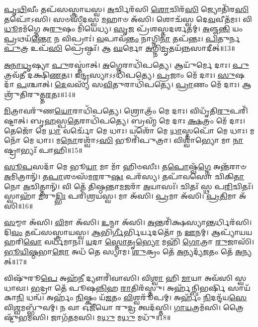 \-\ul{𑌪𑍃}\-\-\ul{𑌥𑌿}\-𑌵𑍀𑌂 𑌤𑌪᳴𑌸𑌸𑍍𑌤𑍍𑌰𑌾𑌯𑌸𑍍𑌵। 
\-\ul{𑌅}\-𑌰𑍍𑌚𑌿𑌰᳴𑌸𑌿 \ul{𑌶𑍋}\-𑌚𑌿𑌰᳴\-\ul{𑌸𑌿} 𑌜𑍍𑌯𑍋𑌤𑌿᳴𑌰\-\ul{𑌸𑌿} 𑌤𑌪𑍋᳴𑌽𑌸𑌿। 
𑌸𑍞𑌸𑍀᳴𑌦𑌸𑍍𑌵 \ul{𑌮}\-𑌹𑌾𑍞 𑌅᳴𑌸𑌿। 
𑌶𑍋𑌚᳴𑌸𑍍𑌵 𑌦𑍇\-\ul{𑌵}\-𑌵𑍀𑌤᳴𑌮𑌃। 
𑌵𑌿\-\ul{𑌧𑍂}\-𑌮𑌮᳴𑌗𑍍𑌨𑍇 𑌅\-\ul{𑌰𑍁}\-𑌷𑌂 𑌮𑌿᳴𑌯𑍇𑌧𑍍𑌯। 
\-\ul{𑌸𑍃}\-𑌜 𑌪𑍍𑌰᳴𑌶𑌸𑍍𑌤𑌦𑌰𑍍\mbox{}\-\ul{𑌶}\-𑌤𑌮𑍍। 
\-\ul{𑌅}\-𑌞𑍍𑌜\-\ul{𑌨𑍍𑌤𑌿} 𑌯𑌂 \ul{𑌪𑍍𑌰}\-𑌥𑌯᳴\-\ul{𑌨𑍍𑌤𑍋} 𑌨 𑌵𑌿𑌪𑍍𑌰𑌾𑌃॑। 
\-\ul{𑌵}\-𑌪𑌾𑌵᳴\-\ul{𑌨𑍍𑌤𑌂} 𑌨𑌾𑌗𑍍𑌨𑌿\-\ul{𑌨𑌾} 𑌤𑌪᳴𑌨𑍍𑌤𑌃। 
\-\ul{𑌪𑌿}\-𑌤𑍁𑌰𑍍𑌨 \ul{𑌪𑍁}\-𑌤𑍍𑌰 𑌉𑌪᳴\-\ul{𑌸𑌿} 𑌪𑍍𑌰𑍇𑌷𑍍𑌠𑌃᳴। 
𑌆 \ul{𑌘}\-𑌰𑍍𑌮𑍋 \ul{𑌅}\-𑌗𑍍𑌨𑌿\-\ul{𑌮𑍃}\-𑌤𑌯᳴𑌨𑍍𑌨𑌸𑌾𑌦𑍀𑌤𑍍॥13॥

\-\ul{𑌅}\-\-\ul{𑌨𑌾}\-\-\ul{𑌧𑍃}\-𑌷𑍍𑌯𑌾 \ul{𑌪𑍁}\-𑌰𑌸𑍍𑌤𑌾॑𑌤𑍍। 
\-\ul{𑌅}\-𑌗𑍍𑌨𑍇𑌰𑌾𑌧𑌿᳴𑌪𑌤𑍍𑌯𑍇। 
𑌆𑌯𑍁᳴𑌰𑍍𑌮𑍇 𑌦𑌾𑌃। 
\-\ul{𑌪𑍁}\-𑌤𑍍𑌰𑌵᳴𑌤𑍀 𑌦𑌕𑍍𑌷𑌿\-\ul{𑌣}\-𑌤𑌃। 
𑌇\-\ul{𑌨𑍍𑌦𑍍𑌰}\-𑌸𑍍𑌯𑌾𑌽𑌽𑌧𑌿᳴𑌪𑌤𑍍𑌯𑍇। 
\-\ul{𑌪𑍍𑌰}\-𑌜𑌾𑌂 𑌮𑍇᳴ 𑌦𑌾𑌃। 
\-\ul{𑌸𑍁}\-𑌷𑌦𑌾᳴ \ul{𑌪}\-𑌶𑍍𑌚𑌾𑌤𑍍। 
\-\ul{𑌦𑍇}\-𑌵𑌸𑍍𑌯᳴ 𑌸\-\ul{𑌵𑌿}\-𑌤𑍁𑌰𑌾𑌧𑌿᳴𑌪𑌤𑍍𑌯𑍇। 
\-\ul{𑌪𑍍𑌰𑌾}\-𑌣𑌂 𑌮𑍇᳴ 𑌦𑌾𑌃। 
𑌆𑌶𑍍𑌰𑍁᳴𑌤𑌿𑌰𑍁𑌤𑍍𑌤\-\ul{𑌰}\-𑌤𑌃॥14॥

\-\ul{𑌮𑌿}\-𑌤𑍍𑌰𑌾𑌵𑌰𑍁᳴𑌣\-\ul{𑌯𑍋}\-𑌰𑌾𑌧𑌿᳴𑌪𑌤𑍍𑌯𑍇। 
𑌶𑍍𑌰𑍋𑌤𑍍𑌰𑌂᳴ 𑌮𑍇 𑌦𑌾𑌃। 
𑌵𑌿𑌧𑍃᳴𑌤𑌿\-\ul{𑌰𑍁}\-𑌪𑌰𑌿᳴𑌷𑍍𑌟𑌾𑌤𑍍। 
𑌬𑍃\-\ul{𑌹}\-𑌸𑍍𑌪\-\ul{𑌤𑍇}\-𑌰𑌾𑌧𑌿᳴𑌪𑌤𑍍𑌯𑍇। 
𑌬𑍍𑌰𑌹𑍍𑌮᳴ 𑌮𑍇 𑌦𑌾𑌃 \ul{𑌕𑍍𑌷}\-𑌤𑍍𑌰𑌂 𑌮𑍇᳴ 𑌦𑌾𑌃। 
𑌤𑍇𑌜𑍋᳴ 𑌮𑍇 \ul{𑌧𑌾} 𑌵𑌰𑍍𑌚𑍋᳴ 𑌮𑍇 𑌧𑌾𑌃। 
𑌯𑌶𑍋᳴ 𑌮𑍇 \ul{𑌧𑌾}\-𑌸𑍍𑌤𑌪𑍋᳴ 𑌮𑍇 𑌧𑌾𑌃। 
𑌮𑌨𑍋᳴ 𑌮𑍇 𑌧𑌾𑌃। 
𑌮\-\ul{𑌨𑍋}\-𑌰𑌶𑍍𑌵𑌾᳴𑌽\-\ul{𑌸𑌿} 𑌭𑍂𑌰𑌿᳴𑌪𑍁𑌤𑍍𑌰𑌾। 
𑌵𑌿𑌶𑍍𑌵𑌾॑𑌭𑍍𑌯𑍋 𑌮𑌾 \ul{𑌨𑌾}\-𑌷𑍍𑌟𑍍𑌰𑌾𑌭𑍍𑌯𑌃᳴ 𑌪𑌾𑌹𑌿॥15॥

\-\ul{𑌸𑍂}\-\-\ul{𑌪}\-𑌸𑌦𑌾᳴ 𑌮𑍇 𑌭𑍂\-\ul{𑌯𑌾} 𑌮𑌾 𑌮𑌾᳴ 𑌹𑌿𑍞𑌸𑍀𑌃। 
𑌤\-\ul{𑌪𑍋}\-𑌷𑍍𑌵᳴\-\ul{𑌗𑍍𑌨𑍇} 𑌅𑌨𑍍𑌤᳴𑌰𑌾𑍞 \ul{𑌅}\-𑌮𑌿𑌤𑍍𑌰𑌾𑌨𑍍᳴। 
𑌤\-\ul{𑌪𑌾}\-𑌶𑍞𑌸᳴𑌮\-\ul{𑌰}\-𑌰𑍁\-\ul{𑌷𑌃} 𑌪𑌰᳴𑌸𑍍𑌯। 
𑌤𑌪𑌾᳴𑌵𑌸𑍋 𑌚𑌿𑌕𑌿\-\ul{𑌤𑌾}\-𑌨𑍋 \ul{𑌅}\-𑌚𑌿𑌤𑍍𑌤𑌾𑌨𑍍᳴। 
𑌵𑌿 𑌤𑍇᳴ 𑌤𑌿𑌷𑍍𑌠𑌨𑍍𑌤𑌾\-\ul{𑌮}\-𑌜𑌰𑌾᳴ \ul{𑌅}\-𑌯𑌾𑌸𑌃᳴। 
𑌚𑌿𑌤𑌃᳴ 𑌸𑍍𑌥 𑌪\-\ul{𑌰𑌿}\-𑌚𑌿𑌤𑌃᳴। 
𑌸𑍍𑌵𑌾𑌹𑌾᳴ \ul{𑌮}\-𑌰𑍁\-\ul{𑌦𑍍𑌭𑌿𑌃} 𑌪𑌰𑌿᳴𑌶𑍍𑌰𑌯𑌸𑍍𑌵। 
𑌮𑌾 𑌅᳴𑌸𑌿। 
\-\ul{𑌪𑍍𑌰}\-𑌮𑌾 𑌅᳴𑌸𑌿। 
\-\ul{𑌪𑍍𑌰}\-\-\ul{𑌤𑌿}\-𑌮𑌾 𑌅᳴𑌸𑌿॥16॥

\-\ul{𑌸}\-𑌮𑍍𑌮𑌾 𑌅᳴𑌸𑌿। 
\-\ul{𑌵𑌿}\-𑌮𑌾 𑌅᳴𑌸𑌿। 
\-\ul{𑌉}\-𑌨𑍍𑌮𑌾 𑌅᳴𑌸𑌿। 
\-\ul{𑌅}\-𑌨𑍍𑌤𑌰𑌿᳴𑌕𑍍𑌷𑌸𑍍𑌯𑌾\-\ul{𑌨𑍍𑌤}\-𑌰𑍍𑌧𑌿\-𑌰᳴𑌸𑌿। 
𑌦𑌿\-\ul{𑌵𑌂} 𑌤𑌪᳴𑌸𑌸𑍍𑌤𑍍𑌰𑌾𑌯𑌸𑍍𑌵। 
\-\ul{𑌆}\-𑌭𑌿\-\ul{𑌰𑍍𑌗𑍀}\-𑌰𑍍𑌭𑌿𑌰𑍍𑌯𑌦𑌤𑍋᳴ 𑌨 \ul{𑌊}\-𑌨𑌮𑍍। 
𑌆𑌪𑍍𑌯𑌾᳴𑌯𑌯 𑌹𑌰𑌿\-\ul{𑌵𑍋} 𑌵𑌰𑍍𑌧᳴𑌮𑌾𑌨𑌃। 
\-\ul{𑌯}\-𑌦𑌾 \ul{𑌸𑍍𑌤𑍋}\-𑌤𑍃\-\ul{𑌭𑍍𑌯𑍋} 𑌮𑌹𑌿᳴ \ul{𑌗𑍋}\-𑌤𑍍𑌰𑌾 \ul{𑌰𑍁}\-𑌜𑌾𑌸𑌿᳴। 
\-\ul{𑌭𑍂}\-\-\ul{𑌯𑌿}\-\-\ul{𑌷𑍍𑌠}\-𑌭𑌾\-\ul{𑌜𑍋} 𑌅𑌧᳴ 𑌤𑍇 𑌸𑍍𑌯𑌾𑌮। 
\-\ul{𑌶𑍁}\-𑌕𑍍𑌰𑌂 𑌤𑍇᳴ \ul{𑌅}\-𑌨𑍍𑌯𑌦𑍍𑌯᳴\-\ul{𑌜}\-𑌤𑌂 𑌤𑍇᳴ \ul{𑌅}\-𑌨𑍍𑌯𑌤𑍍॥17॥

𑌵𑌿𑌷𑍁᳴𑌰𑍂\-\ul{𑌪𑍇} 𑌅𑌹᳴\-\ul{𑌨𑍀} 𑌦𑍍𑌯𑍗𑌰𑌿᳴𑌵𑌾𑌸𑌿। 
𑌵𑌿\-\ul{𑌶𑍍𑌵𑌾} 𑌹𑌿 \ul{𑌮𑌾}\-𑌯𑌾 𑌅𑌵᳴𑌸𑌿 𑌸𑍍𑌵𑌧𑌾𑌵𑌃। 
\-\ul{𑌭}\-𑌦𑍍𑌰𑌾 𑌤𑍇᳴ 𑌪𑍂𑌷\-\ul{𑌨𑍍𑌨𑌿}\-𑌹 \ul{𑌰𑌾}\-𑌤𑌿𑌰᳴𑌸𑍍𑌤𑍁। 
𑌅𑌰𑍍\mbox{}𑌹᳴𑌨𑍍𑌬𑌿𑌭𑌰𑍍\mbox{}\-\ul{𑌷𑌿} 𑌸𑌾𑌯᳴𑌕𑌾\-\ul{𑌨𑌿} 𑌧𑌨𑍍𑌵᳴। 
𑌅𑌰𑍍\mbox{}𑌹𑌂᳴ \ul{𑌨𑌿}\-𑌷𑍍𑌕𑌂 𑌯᳴\-\ul{𑌜}\-𑌤𑌂  \ul{𑌵𑌿}\-𑌶𑍍𑌵𑌰𑍂᳴𑌪𑌮𑍍। 
𑌅𑌰𑍍\mbox{}𑌹𑌂᳴ \ul{𑌨𑌿}\-𑌦𑌨𑍍𑌦᳴𑌯\-\ul{𑌸𑍇} 𑌵𑌿\-\ul{𑌶𑍍𑌵}\-𑌮𑌬𑍍𑌭𑍁᳴𑌵𑌮𑍍। 
𑌨 𑌵𑌾 𑌓𑌜𑍀᳴𑌯𑍋 𑌰𑍁\-\ul{𑌦𑍍𑌰} 𑌤𑍍𑌵𑌦᳴𑌸𑍍𑌤𑌿। 
\-\ul{𑌗𑌾}\-\-\ul{𑌯}\-𑌤𑍍𑌰𑌮᳴𑌸𑌿। 
𑌤𑍍𑌰𑍈𑌷𑍍𑌟𑍁᳴𑌭𑌮𑌸𑌿। 
𑌜𑌾𑌗᳴𑌤𑌮𑌸𑌿। 
𑌮\-\ul{𑌧𑍁} 𑌮\-\ul{𑌧𑍁} 𑌮𑌧𑍁᳴॥18॥
\anuvakamend[\-\ul{𑌅}\-\-\ul{𑌨}\-\-\ul{𑌕𑍍𑌤𑍍𑌵}\-\-\ul{𑌸𑌾}\-\-\ul{𑌦𑍀}\-\-\ul{𑌦𑍁}\-\-\ul{𑌤𑍍𑌤}\-\-\ul{𑌰}\-𑌤𑌃 𑌪𑌾᳴𑌹𑌿 𑌪𑍍𑌰\-\ul{𑌤𑌿}\-𑌮𑌾 𑌅᳴𑌸𑌿 𑌯\-\ul{𑌜}\-𑌤𑌨𑍍𑌤𑍇᳴ \ul{𑌅}\-𑌨𑍍𑌯𑌜𑍍𑌜𑌾𑌗᳴𑌤\-\ul{𑌮}\-𑌸𑍍𑌯𑍇𑌕𑌂᳴ 𑌚]

